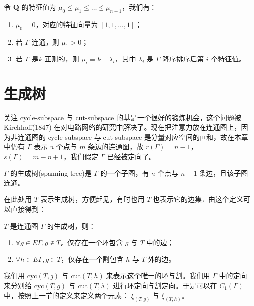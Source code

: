 \begin{proposition}[Laplacian谱]
令 $\textbf{Q}$ 的特征值为 $\mu_0 \le \mu_1 \le \dots \le \mu_{n - 1}$，我们有：
\begin{enumerate}
    \item $\mu_0 = 0$，对应的特征向量为 $[1, 1, \dots, 1]$；
    \item 若 $\Gamma$ 连通，则 $\mu_1 > 0$；
    \item 若 $\Gamma$ 是$k$-正则的，则 $\mu_i = k - \lambda_i$，其中 $\lambda_i$ 是 $\Gamma$ 降序排序后第 $i$ 个特征值。
\end{enumerate}
\end{proposition}



\section{生成树}

关注 cycle-subspace 与 cut-subspace 的基是一个很好的锻炼机会，这个问题被 Kirchhoff(1847) 在对电路网络的研究中解决了。现在把注意力放在连通图上，因为非连通图的 cycle-subspace 与 cut-subspace 是分量对应空间的直和，故在本章中仍有 $\Gamma$ 表示 $n$ 个点与 $m$ 条边的连通图，故 $r(\Gamma) = n - 1$，$s(\Gamma) = m - n + 1$，我们假定 $\Gamma$ 已经被定向了。

\begin{definition}[生成树]
$\Gamma$ 的生成树(spanning tree)是 $\Gamma$ 的一个子图，有 $n$ 个点与 $n - 1$ 条边，且该子图连通。
\end{definition}

在此处用 $T$ 表示生成树，方便起见，有时也用 $T$ 也表示它的边集，由这个定义可以直接得到：

\begin{lemma}
$T$ 是连通图 $\Gamma$ 的生成树，则：
\begin{enumerate}
    \item $\forall g\in E\Gamma, g \notin T$，仅存在一个环包含 $g$ 与 $T$ 中的边；
    \item $\forall h\in E\Gamma, g \in T$，仅存在一个割包含 $h$ 与 $T$ 外的边。
\end{enumerate}
\end{lemma}

我们用 $\text{cyc}(T,g)$ 与 $\text{cut}(T,h)$ 来表示这个唯一的环与割。我们用 $\Gamma$ 中的定向来分别给 $\text{cyc}(T,g)$ 与 $\text{cut}(T,h)$ 进行环定向与割定向。于是可以在 $C_1(\Gamma)$ 中，按照上一节的定义来定义两个元素： $\xi_{(T,g)}$ 与 $\xi_{(T,h)}$。

